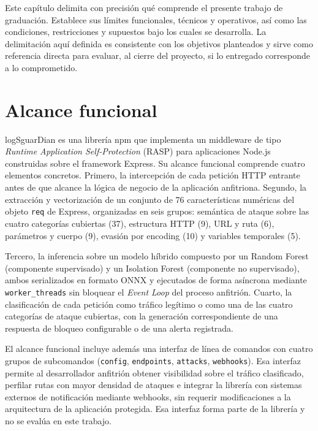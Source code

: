 Este capítulo delimita con precisión qué comprende el presente trabajo de graduación. Establece sus límites funcionales, técnicos y operativos, así como las condiciones, restricciones y supuestos bajo los cuales se desarrolla. La delimitación aquí definida es consistente con los objetivos planteados y sirve como referencia directa para evaluar, al cierre del proyecto, si lo entregado corresponde a lo comprometido.

\section{Alcance funcional}

logSguarDian es una librería npm que implementa un middleware de tipo \textit{Runtime Application Self-Protection} (RASP) para aplicaciones Node.js construidas sobre el framework Express. Su alcance funcional comprende cuatro elementos concretos. Primero, la intercepción de cada petición HTTP entrante antes de que alcance la lógica de negocio de la aplicación anfitriona. Segundo, la extracción y vectorización de un conjunto de 76 características numéricas del objeto \texttt{req} de Express, organizadas en seis grupos: semántica de ataque sobre las cuatro categorías cubiertas (37), estructura HTTP (9), URL y ruta (6), parámetros y cuerpo (9), evasión por encoding (10) y variables temporales (5).

Tercero, la inferencia sobre un modelo híbrido compuesto por un Random Forest (componente supervisado) y un Isolation Forest (componente no supervisado), ambos serializados en formato ONNX y ejecutados de forma asíncrona mediante \texttt{worker\_threads} sin bloquear el \textit{Event Loop} del proceso anfitrión. Cuarto, la clasificación de cada petición como tráfico legítimo o como una de las cuatro categorías de ataque cubiertas, con la generación correspondiente de una respuesta de bloqueo configurable o de una alerta registrada.

El alcance funcional incluye además una interfaz de línea de comandos con cuatro grupos de subcomandos (\texttt{config}, \texttt{endpoints}, \texttt{attacks}, \texttt{webhooks}). Esa interfaz permite al desarrollador anfitrión obtener visibilidad sobre el tráfico clasificado, perfilar rutas con mayor densidad de ataques e integrar la librería con sistemas externos de notificación mediante webhooks, sin requerir modificaciones a la arquitectura de la aplicación protegida. Esa interfaz forma parte de la librería y no se evalúa en este trabajo.

